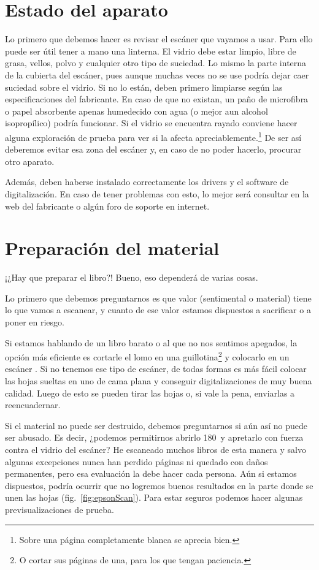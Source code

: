 \documentclass[%
	a5paper,
	10pt,
	twoside,
	openright,
	final,
]{memoir}
\begin{document}
	\section{Estado del aparato\label{sec:scanningState}} Lo primero que debemos hacer es revisar el escáner que vayamos a usar. Para ello puede ser útil tener a mano una linterna. El vidrio debe estar limpio, libre de grasa, vellos, polvo y cualquier otro tipo de suciedad. Lo mismo la parte interna de la cubierta del escáner, pues aunque muchas veces no se use podría dejar caer suciedad sobre el vidrio. Si no lo están, deben primero limpiarse según las especificaciones del fabricante. En caso de que no existan, un paño de microfibra o papel absorbente apenas humedecido con agua (o mejor aun alcohol isopropílico) podría funcionar. Si el vidrio se encuentra rayado conviene hacer alguna exploración de prueba para ver si la afecta apreciablemente.\footnote{Sobre una página completamente blanca se aprecia bien.} De ser así deberemos evitar esa zona del escáner y, en caso de no poder hacerlo, procurar otro aparato.

	Además, deben haberse instalado correctamente los drivers y el software de digitalización. En caso de tener problemas con esto, lo mejor será consultar en la web del fabricante o algún foro de soporte en internet.

	\section{Preparación del material\label{sec:scanningPreparingMaterial}} ¡¿Hay que preparar el libro?! Bueno, eso dependerá de varias cosas.

	Lo primero que debemos preguntarnos es que valor (sentimental o material) tiene lo que vamos a escanear, y cuanto de ese valor estamos dispuestos a sacrificar o a poner en riesgo.

	Si estamos hablando de un libro barato o al que no nos sentimos apegados, la opción más eficiente es cortarle el lomo en una guillotina\footnote{O cortar sus páginas de una, para los que tengan paciencia.} y colocarlo en un escáner \adf. Si no tenemos ese tipo de escáner, de todas formas es más fácil colocar las hojas sueltas en uno de cama plana y conseguir digitalizaciones de muy buena calidad. Luego de esto se pueden tirar las hojas o, si vale la pena, enviarlas a reencuadernar.

	Si el material no puede ser destruido, debemos preguntarnos si aún así no puede ser abusado. Es decir, ¿podemos permitirnos abrirlo 180\textdegree\ y apretarlo con fuerza contra el vidrio del escáner? He escaneado muchos libros de esta manera y salvo algunas excepciones nunca han perdido páginas ni quedado con daños permanentes, pero esa evaluación la debe hacer cada persona. %
	Aún si estamos dispuestos, podría ocurrir que no logremos buenos resultados en la parte donde se unen las hojas (fig.~\ref{fig:epsonScan}). Para estar seguros podemos hacer algunas previsualizaciones de prueba.
\end{document}

